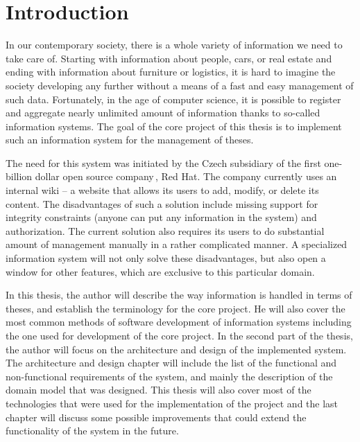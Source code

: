 \chapter{Introduction}

In our contemporary society, there is a whole variety of information we need to take care of. Starting with information about people, cars, or real estate and ending with information about furniture or logistics, it is hard to imagine the society developing any further without a means of a fast and easy management of such data. Fortunately, in the age of computer science, it is possible to register and aggregate nearly unlimited amount of information thanks to so-called information systems. The goal of the core project of this thesis is to implement such an information system for the management of theses.

The need for this system was initiated by the Czech subsidiary of the first one-billion dollar open source company\,\cite{redhat-revenue}, Red Hat. The company currently uses an internal wiki -- a website that allows its users to add, modify, or delete its content. The disadvantages of such a solution include missing support for integrity constraints (anyone can put any information in the system) and authorization. The current solution also requires its users to do substantial amount of management manually in a rather complicated manner. A specialized information system will not only solve these disadvantages, but also open a window for other features, which are exclusive to this particular domain.

In this thesis, the author will describe the way information is handled in terms of theses, and establish the terminology for the core project. He will also cover the most common methods of software development of information systems including the one used for development of the core project. In the second part of the thesis, the author will focus on the architecture and design of the implemented system. The architecture and design chapter will include the list of the functional and non-functional requirements of the system, and mainly the description of the domain model that was designed. This thesis will also cover most of the technologies that were used for the implementation of the project and the last chapter will discuss some possible improvements that could extend the functionality of the system in the future.
